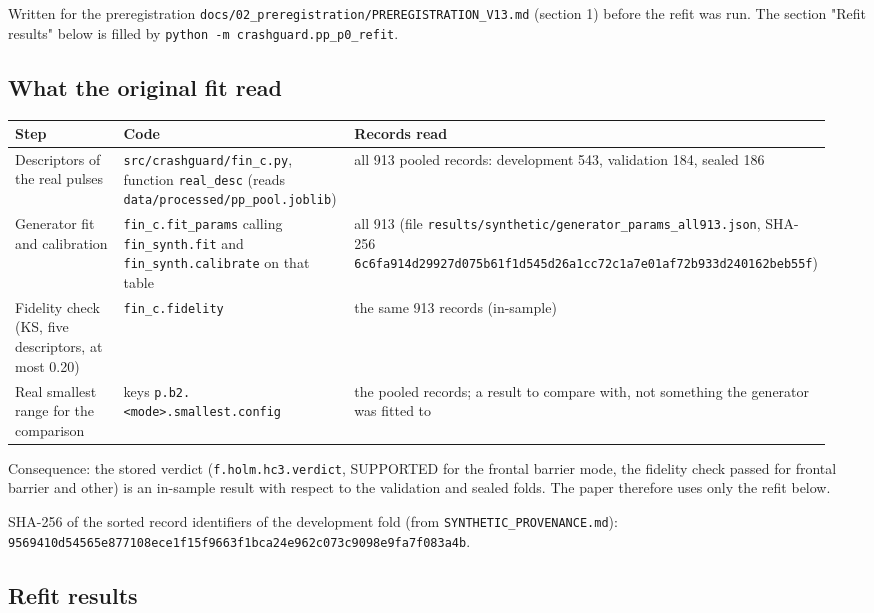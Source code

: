 


Written for the preregistration \texttt{docs/02\_preregistration/PREREGISTRATION\_V13.md} (section 1) before the refit was run. The section "Refit results" below is filled by \texttt{python -m crashguard.pp\_p0\_refit}.

\subsection*{What the original fit read}

{\scriptsize\raggedright
\begin{longtable}{p{0.317\linewidth}p{0.317\linewidth}p{0.317\linewidth}}
\toprule
Step & Code & Records read \\
\midrule
\endhead
Descriptors of the real pulses & \texttt{src/crashguard/fin\_c.py}, function \texttt{real\_desc} (reads \texttt{data/processed/pp\_pool.joblib}) & all 913 pooled records: development 543, validation 184, sealed 186 \\
Generator fit and calibration & \texttt{fin\_c.fit\_params} calling \texttt{fin\_synth.fit} and \texttt{fin\_synth.calibrate} on that table & all 913 (file \texttt{results/synthetic/generator\_params\_all913.json}, SHA-256 \texttt{6c6fa914d29927d075b61f1d545d26a1cc72c1a7e01af72b933d240162beb55f}) \\
Fidelity check (KS, five descriptors, at most 0.20) & \texttt{fin\_c.fidelity} & the same 913 records (in-sample) \\
Real smallest range for the comparison & keys \texttt{p.b2.<mode>.smallest.config} & the pooled records; a result to compare with, not something the generator was fitted to \\
\bottomrule
\end{longtable}}

Consequence: the stored verdict (\texttt{f.holm.hc3.verdict}, SUPPORTED for the frontal barrier mode, the fidelity check passed for frontal barrier and other) is an in-sample result with respect to the validation and sealed folds. The paper therefore uses only the refit below.

SHA-256 of the sorted record identifiers of the development fold (from \texttt{SYNTHETIC\_PROVENANCE.md}): \texttt{9569410d54565e877108ece1f15f9663f1bca24e962c073c9098e9fa7f083a4b}.


\subsection*{Refit results}

